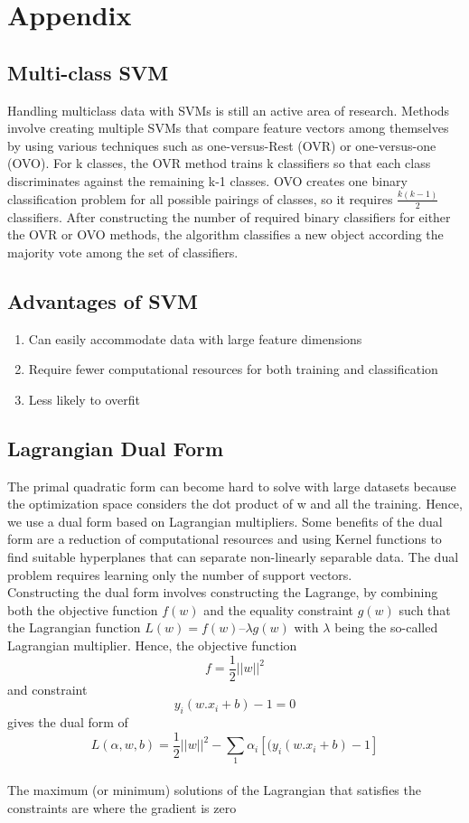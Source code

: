 \documentclass[11pt]{article}
\begin{document}
\pagebreak

\section{Appendix}
\subsection{Multi-class SVM}
Handling multiclass data with SVMs is still an active area of research. Methods involve creating multiple SVMs that compare feature vectors among themselves by using various techniques such as one-versus-Rest (OVR) or one-versus-one (OVO). For k classes, the OVR method trains k classifiers so that each class discriminates against the remaining k-1 classes. OVO creates one binary classification problem for all possible pairings of classes, so it requires $\frac{k(k-1)}{2}$ classifiers\cite{bhattacharyya_2020}. After constructing the number of required binary classifiers for either the OVR or OVO methods, the algorithm classifies a new object according the majority vote among the set of classifiers.
\subsection{Advantages of SVM}
\begin{enumerate}
    \item Can easily accommodate data with large feature dimensions 
    \item Require fewer computational resources for both training and classification\cite{pisner2020support}
    \item Less likely to overfit
\end{enumerate}
\subsection{Lagrangian Dual Form}
The primal quadratic form can become hard to solve with large datasets because the optimization space considers the dot product of w and all the training. Hence, we use a dual form based on Lagrangian multipliers\cite{bridgelall2022tutorial}. Some benefits of the dual form are a reduction of computational resources and using Kernel functions to find suitable hyperplanes that can separate non-linearly separable data. The dual problem requires learning only the number of support vectors. \\Constructing the dual form involves constructing the Lagrange, by
combining both the objective function $f(w)$ and the equality constraint $g(w)$ such that the Lagrangian function $L(w) = f(w) – \lambda g(w)$ with $\lambda$ being the so-called Lagrangian multiplier.
Hence, the objective function \[f=\frac{1}{2}||w||^2\] and constraint \[ y_i(w.x_i+b)-1=0\] gives the dual form of
\[L(\alpha,w,b)=\frac{1}{2}||w||^2-\sum_1\alpha_i[(y_i(w.x_i+b)-1]\]
\\The maximum (or minimum) solutions of the Lagrangian that satisfies the constraints are where the gradient is zero 
\end{document}
